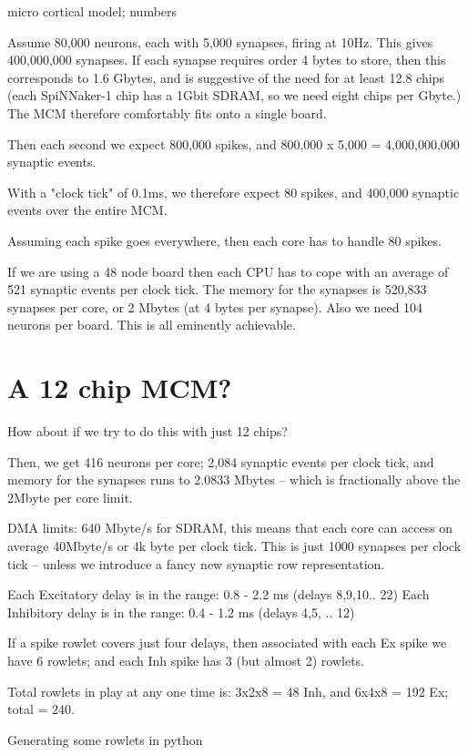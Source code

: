 
micro cortical model; numbers

Assume 80,000 neurons, each with 5,000 synapses, firing at 10Hz. This
gives 400,000,000 synapses.  If each synapse requires order 4 bytes to
store, then this corresponds to 1.6 Gbytes, and is suggestive of the
need for at least 12.8 chips (each SpiNNaker-1 chip has a 1Gbit SDRAM,
so we need eight chips per Gbyte.) The MCM therefore comfortably fits onto a
single board.

Then each second we expect 800,000 spikes, and 800,000 x 5,000 =
4,000,000,000 synaptic events.

With a "clock tick" of 0.1ms, we therefore expect 80 spikes, and
400,000 synaptic events over the entire MCM.

Assuming each spike goes everywhere, then each core has to handle 80
spikes.

If we are using a 48 node board then each CPU has to cope with an
average of 521 synaptic events per clock tick.  The memory for the
synapses is 520,833 synapses per core, or 2 Mbytes (at 4 bytes per
synapse). Also we need 104 neurons per board. This is all eminently
achievable.

\section{A 12 chip MCM?}

How about if we try to do this with just 12 chips?

Then, we get 416 neurons per core; 2,084 synaptic events per clock
tick, and memory for the synapses runs to 2.0833 Mbytes -- which is
fractionally above the 2Mbyte per core limit.


DMA limits: 640 Mbyte/s for SDRAM, this means that each core can
access on average 40Mbyte/s or 4k byte per clock tick. This is just
1000 synapses per clock tick -- unless we introduce a fancy new
synaptic row representation.


Each Excitatory delay is in the range: 0.8 - 2.2 ms (delays 8,9,10.. 22)
Each Inhibitory delay is in the range: 0.4 - 1.2 ms (delays 4,5, .. 12)

If a spike rowlet covers just four delays, then associated with each Ex spike we have 6 rowlets;
and each Inh spike has 3 (but almost 2) rowlets.

Total rowlets in play at any one time is: 3x2x8 = 48 Inh, and 6x4x8 =
192 Ex; total = 240.


Generating some rowlets in python

